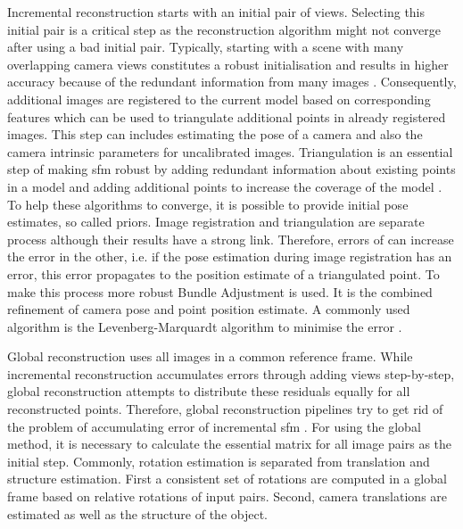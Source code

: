 Incremental reconstruction starts with an initial pair of views. Selecting this initial pair is a critical step as the reconstruction algorithm might not converge after using a bad initial pair. Typically, starting with a scene with many overlapping camera views constitutes a robust initialisation and results in higher accuracy because of the redundant information from many images \cite{schonberger2016structure}.
Consequently, additional images are registered to the current model based on corresponding features which can be used to triangulate additional points in already registered images. This step can includes estimating the pose of a camera and also the camera intrinsic parameters for uncalibrated images. Triangulation is an essential step of making \gls{sfm} robust by adding redundant information about existing points in a model and adding additional points to increase the coverage of the model \cite{schonberger2016structure}. To help these algorithms to converge, it is possible to provide initial pose estimates, so called priors.
Image registration and triangulation are separate process although their results have a strong link. Therefore, errors of can increase the error in the other, i.e. if the pose estimation during image registration has an error, this error propagates to the position estimate of a triangulated point. To make this process more robust Bundle Adjustment is used. It is the combined refinement of camera pose and point position estimate. A commonly used algorithm is the Levenberg-Marquardt algorithm to minimise the error \cite{schonberger2016structure, moulon2012adaptive}.

Global reconstruction uses all images in a common reference frame. While incremental reconstruction accumulates errors through adding views step-by-step, global reconstruction attempts to distribute these residuals equally for all reconstructed points. Therefore, global reconstruction pipelines try to get rid of the problem of accumulating error of incremental \gls{sfm} \cite{Moulon_2013_ICCV}.
For using the global method, it is necessary to calculate the essential matrix for all image pairs as the initial step. Commonly, rotation estimation is separated from translation and structure estimation. First a consistent set of rotations are computed in a global frame based on relative rotations of input pairs. Second, camera translations are estimated as well as the structure of the object.


